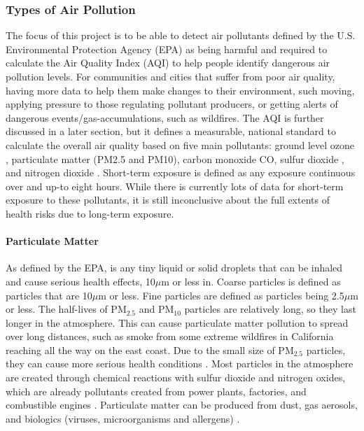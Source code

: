 \subsubsection{Types of Air Pollution}
The focus of this project is to be able to detect air pollutants defined by the
U.S.  Environmental Protection Agency (EPA) as being harmful and required to
calculate the Air Quality Index (AQI) to help people identify dangerous air
pollution levels. For communities and cities that suffer from poor air quality,
having more data to help them make changes to their environment, such moving, 
applying pressure to those regulating pollutant producers, or getting alerts of
dangerous events/gas-accumulations, such as wildfires. The AQI is further
discussed in a later section, but it defines a measurable, national standard to
calculate the overall air quality based on five main pollutants: ground level
ozone \ozone, particulate matter (PM2.5 and PM10), carbon monoxide CO, sulfur
dioxide \sdo, and nitrogen dioxide \ndo \cite{technical-aqi}. Short-term
exposure is defined as any exposure continuous over and up-to eight hours. While
there is currently lots of data for short-term exposure to these pollutants, it
is still inconclusive about the full extents of health risks due to long-term
exposure.

\paragraph{Particulate Matter} As defined by the EPA, is
any tiny liquid or solid droplets that can be inhaled and cause serious health
effects, 10$\mu$m or less in. Coarse particles is defined as particles that are
10$\mu$m or less. Fine particles are defined as particles being 2.5$\mu$m or
less. The half-lives of PM$_{2.5}$ and PM$_{10}$ particles are relatively long,
so they last longer in the atmosphere. This can cause particulate matter
pollution to spread over long distances, such as smoke from some extreme
wildfires in California reaching all the way on the east coast. Due to the small
size of PM$_{2.5}$ particles, they can cause more serious health conditions
\cite{health-impacts-air-pollution-review}. Most particles in the atmosphere
are created through chemical reactions with sulfur dioxide and nitrogen oxides,
which are already pollutants created from power plants, factories, and
combustible engines \cite{epa-what-is-pm}.  Particulate matter can be produced
from dust, gas aerosols, and biologics (viruses, microorganisms and allergens)
\cite{health-impacts-air-pollution-review}.

